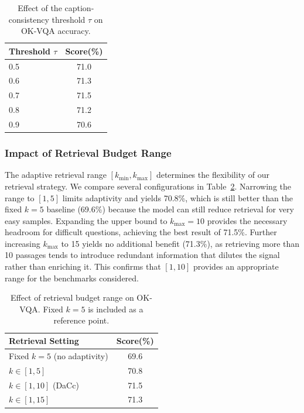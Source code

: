 \documentclass[manuscript,screen,review]{acmart}
\begin{document}
\begin{table}[t]
\centering
\caption{Effect of the caption-consistency threshold $\tau$ on OK-VQA accuracy.}
\label{tab:tau}
\begin{tabular}{l c}
\hline
Threshold $\tau$ & Score(\%) \\
\hline
0.5 & 71.0 \\
0.6 & 71.3 \\
0.7 & 71.5 \\
0.8 & 71.2 \\
0.9 & 70.6 \\
\hline
\end{tabular}
\end{table}

\subsubsection{Impact of Retrieval Budget Range}

The adaptive retrieval range $[k_{\min}, k_{\max}]$ determines the flexibility of our retrieval strategy. We compare several configurations in Table~\ref{tab:krange}. Narrowing the range to $[1,5]$ limits adaptivity and yields 70.8\%, which is still better than the fixed $k=5$ baseline (69.6\%) because the model can still reduce retrieval for very easy samples. Expanding the upper bound to $k_{\max}=10$ provides the necessary headroom for difficult questions, achieving the best result of 71.5\%. Further increasing $k_{\max}$ to 15 yields no additional benefit (71.3\%), as retrieving more than 10 passages tends to introduce redundant information that dilutes the signal rather than enriching it. This confirms that $[1,10]$ provides an appropriate range for the benchmarks considered.

\begin{table}[t]
\centering
\caption{Effect of retrieval budget range on OK-VQA. Fixed $k=5$ is included as a reference point.}
\label{tab:krange}
\begin{tabular}{l c}
\hline
Retrieval Setting & Score(\%) \\
\hline
Fixed $k=5$ (no adaptivity) & 69.6 \\
$k \in [1, 5]$              & 70.8 \\
$k \in [1, 10]$ (DaCc)      & 71.5 \\
$k \in [1, 15]$             & 71.3 \\
\hline
\end{tabular}
\end{table}
\end{document}
